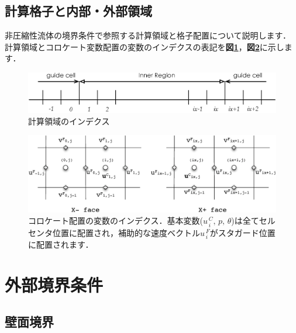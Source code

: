 %
\pagebreak
\subsection{計算格子と内部・外部領域}

非圧縮性流体の境界条件で参照する\hypertarget{tgt:grid_arrangement}{計算領域と格子配置}について説明します．
計算領域とコロケート変数配置の変数のインデクスの表記を\textbf{図\ref{fig:index_domain}}，\textbf{図\ref{fig:index_cc}}に示します．

\begin{figure}[htdp]
  \begin{center}
  \includegraphics[width=12cm,clip]{index_domain.eps}
  \end{center}
  \caption{計算領域のインデクス}
  \label{fig:index_domain}
\end{figure}

\begin{figure}[htdp]
  \begin{center}
  \includegraphics[width=14cm,clip]{index_cc.eps}
  \end{center}
  \caption{コロケート配置の変数のインデクス．基本変数($u_{\,i}^{\,C},\, p,\,\theta$)は全てセルセンタ位置に配置され，補助的な速度ベクトル$u_{\,i}^{\,F}$がスタガード位置に配置されます．}
  \label{fig:index_cc}
\end{figure}



\pagebreak
\section{外部境界条件}

%
\subsection{壁面境界}

